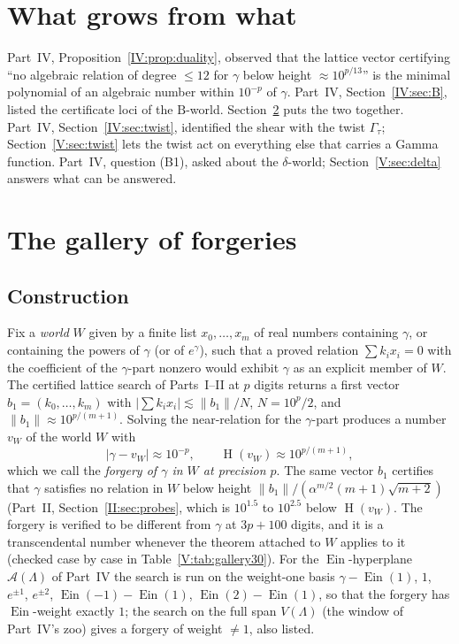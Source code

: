 \documentclass[11pt,a4paper]{article}
\newcommand{\Ein}{\operatorname{Ein}}
\newcommand{\Aff}{\mathcal A}
\DeclareMathOperator{\Ht}{H}
\theoremstyle{definition}
\theoremstyle{remark}
\numberwithin{equation}{section}
\begin{document}
\section{What grows from what}\label{V:sec:intro}

Part~IV, Proposition~\ref{IV:prop:duality}, observed that the lattice vector certifying ``no algebraic
relation of degree $\le12$ for $\gamma$ below height $\approx10^{p/13}$'' is the minimal polynomial
of an algebraic number within $10^{-p}$ of $\gamma$. Part~IV, Section~\ref{IV:sec:B}, listed the
certificate loci of the $\mathrm B$-world. Section~\ref{V:sec:gallery} puts the two together.
Part~IV, Section~\ref{IV:sec:twist}, identified the shear with the twist $\Gamma_\tau$; Section~\ref{V:sec:twist}
lets the twist act on everything else that carries a Gamma function. Part~IV, question
(B1), asked about the $\delta$-world; Section~\ref{V:sec:delta} answers what can be answered.

\section{The gallery of forgeries}\label{V:sec:gallery}

\subsection{Construction}

Fix a \emph{world} $W$ given by a finite list $x_0,\dots,x_m$ of real numbers containing
$\gamma$, or containing the powers of $\gamma$ (or of $e^\gamma$), such that a proved
relation $\sum k_ix_i=0$ with the coefficient of the $\gamma$-part nonzero would exhibit
$\gamma$ as an explicit member of $W$. The certified lattice search of Parts~I--II at $p$
digits returns a first vector $b_1=(k_0,\dots,k_m)$ with $|\sum k_ix_i|\lesssim\|b_1\|/N$,
$N=10^p/2$, and $\|b_1\|\approx10^{p/(m+1)}$. Solving the near-relation for the
$\gamma$-part produces a number $v_W$ of the world $W$ with
\begin{equation}\label{V:eq:forgery}
 |\gamma-v_W|\approx10^{-p},\qquad \Ht(v_W)\approx10^{p/(m+1)} ,
\end{equation}
which we call the \emph{forgery of $\gamma$ in $W$ at precision $p$}. The same vector
$b_1$ certifies that $\gamma$ satisfies no relation in $W$ below height
$\|b_1\|/(\alpha^{m/2}(m+1)\sqrt{m+2})$ (Part~II, Section~\ref{II:sec:probes}, which is $10^{1.5}$ to
$10^{2.5}$ below $\Ht(v_W)$. The forgery is verified to be different from $\gamma$ at
$3p+100$ digits, and it is a transcendental number whenever the theorem attached to $W$
applies to it (checked case by case in Table~\ref{V:tab:gallery30}). For the
$\Ein$-hyperplane $\Aff(\Lambda)$ of Part~IV the search is run on the weight-one basis
$\gamma-\Ein(1)$, $1$, $e^{\pm1}$, $e^{\pm2}$, $\Ein(-1)-\Ein(1)$, $\Ein(2)-\Ein(1)$, so that
the forgery has $\Ein$-weight exactly $1$; the search on the full span $V(\Lambda)$ (the
window of Part~IV's zoo) gives a forgery of weight $\ne1$, also listed.
\end{document}
